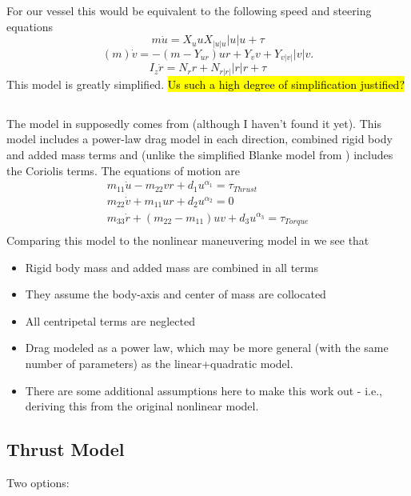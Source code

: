 \documentclass[11pt,draftcls,journal,onecolumn]{IEEEtran}
\begin{document}
For our vessel this would be equivalent to the following speed and steering equations
\begin{equation}
m\dot{u} = X_u u X_{|u|u}|u|u + \tau
\end{equation}
\begin{equation}
(m) \dot{v}
=
-(m -Y_{ur})ur + Y_v v + Y_{v|v|}|v|v .
\label{e:blanke2v}
\end{equation}
\begin{equation}
I_z\dot{r}
=
 N_r r + N_{r|r|}|r|r + \tau
\label{e:blanke2r}
\end{equation}
This model is greatly simplified. \hl{Us such a high degree of simplification justified?}

\subsection{\cite{muske08identification}}
The model in \cite{muske08identification} supposedly comes from  \cite{fossen94guidance} (although I haven't found it yet).  This model includes a power-law drag model in each direction, combined rigid body and added mass terms and (unlike the simplified Blanke model from \cite{caccia08practical}) includes the Coriolis terms.  The equations of motion are
\begin{eqnarray}
m_{11}\dot{u} - m_{22}vr + d_1 u^{\alpha_1} = \tau_{Thrust} \\
m_{22}\dot{v} +  m_{11}ur + d_2 u^{\alpha_2} = 0\\
m_{33}\dot{r} + (m_{22}-m_{11})uv + d_3 u^{\alpha_3} = \tau_{Torque} \\
\end{eqnarray}
Comparing this model to the nonlinear maneuvering model in    we see that
\begin{itemize}
\item Rigid body mass and added mass are combined in all terms
\item They assume the body-axis and center of mass are collocated
\item All centripetal terms are neglected
\item Drag modeled as a power law, which may be more general (with the same number of parameters) as the linear+quadratic model.
\item There are some additional assumptions here to make this work out - i.e., deriving this from the original nonlinear model.
\end{itemize}

\subsection{Thrust Model}
Two options:
\end{document}
